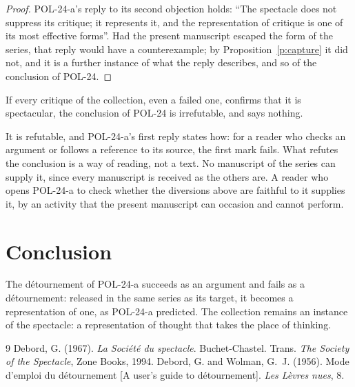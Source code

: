 \documentclass{situationist-preprint}
\begin{document}
\begin{proof}
POL-24-a's reply to its second objection holds: \enquote{The spectacle does not suppress its critique; it represents it, and the representation of critique is one of its most effective forms}. Had the present manuscript escaped the form of the series, that reply would have a counterexample; by Proposition~\ref{p:capture} it did not, and it is a further instance of what the reply describes, and so of the conclusion of POL-24.
\end{proof}

\begin{objection}
If every critique of the collection, even a failed one, confirms that it is spectacular, the conclusion of POL-24 is irrefutable, and says nothing.
\end{objection}

\begin{reply}
It is refutable, and POL-24-a's first reply states how: for a reader who checks an argument or follows a reference to its source, the first mark fails. What refutes the conclusion is a way of reading, not a text. No manuscript of the series can supply it, since every manuscript is received as the others are. A reader who opens POL-24-a to check whether the diversions above are faithful to it supplies it, by an activity that the present manuscript can occasion and cannot perform.
\end{reply}

\section{Conclusion}

The détournement of POL-24-a succeeds as an argument and fails as a détournement: released in the same series as its target, it becomes a representation of one, as POL-24-a predicted. The collection remains an instance of the spectacle: a representation of thought that takes the place of thinking.

\begin{thebibliography}{9}\small
{} Debord, G. (1967). \emph{La Société du spectacle}. Buchet-Chastel. Trans. \emph{The Society of the Spectacle}, Zone Books, 1994.
 Debord, G. and Wolman, G.~J. (1956). Mode d'emploi du détournement [A user's guide to détournement]. \emph{Les Lèvres nues}, 8.
\end{thebibliography}
\end{document}
